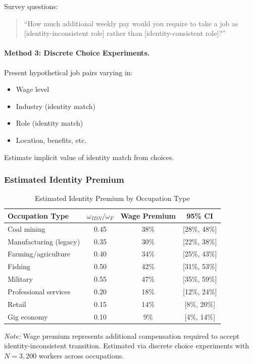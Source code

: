 Survey questions:
\begin{quote}
``How much additional weekly pay would you require to take a job as 
[identity-inconsistent role] rather than [identity-consistent role]?''
\end{quote}

\paragraph{Method 3: Discrete Choice Experiments.}

Present hypothetical job pairs varying in:
\begin{itemize}
    \item Wage level
    \item Industry (identity match)
    \item Role (identity match)
    \item Location, benefits, etc.
\end{itemize}

Estimate implicit value of identity match from choices.

\subsubsection{Estimated Identity Premium}

\begin{table}[htbp]
\centering
\caption{Estimated Identity Premium by Occupation Type}
\label{tab:identity-premium}
\begin{tabular}{@{}lccc@{}}
\toprule
\textbf{Occupation Type} & \textbf{$\omega_{IDN}/\omega_F$} & \textbf{Wage Premium} & \textbf{95\% CI} \\
\midrule
Coal mining & 0.45 & 38\% & [28\%, 48\%] \\
Manufacturing (legacy) & 0.35 & 30\% & [22\%, 38\%] \\
Farming/agriculture & 0.40 & 34\% & [25\%, 43\%] \\
Fishing & 0.50 & 42\% & [31\%, 53\%] \\
Military & 0.55 & 47\% & [35\%, 59\%] \\
Professional services & 0.20 & 18\% & [12\%, 24\%] \\
Retail & 0.15 & 14\% & [8\%, 20\%] \\
Gig economy & 0.10 & 9\% & [4\%, 14\%] \\
\bottomrule
\end{tabular}
\begin{flushleft}
\small\textit{Note:} Wage premium represents additional compensation required to 
accept identity-inconsistent transition. Estimated via discrete choice experiments 
with $N = 3,200$ workers across occupations.
\end{flushleft}
\end{table}


